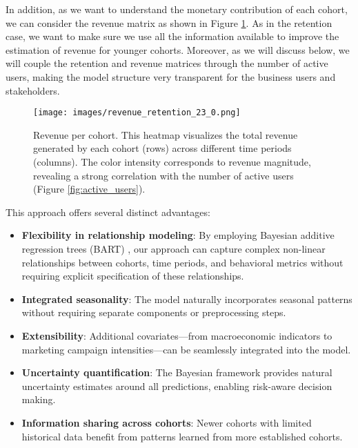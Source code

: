 \documentclass[11pt]{amsart}
\theoremstyle{definition}
\begin{document}
In addition, as we want to understand the monetary contribution of each cohort, we can consider the revenue matrix as shown
in Figure \ref{fig:revenue_matrix}. As in the retention case, we want to make sure we use all the information available to
improve the estimation of revenue for younger cohorts. Moreover, as we will discuss below, we will couple the retention and
revenue matrices through the number of active users, making the model structure very transparent for the business users
and stakeholders.

\begin{figure}
    \centering
    \texttt{[image: images/revenue\_retention\_23\_0.png]}
    \caption{Revenue per cohort. This heatmap visualizes the total revenue generated by each cohort (rows) across different
        time periods (columns). The color intensity corresponds to revenue magnitude, revealing a strong correlation
        with the number of active users (Figure \ref{fig:active_users}).}
    \label{fig:revenue_matrix}
\end{figure}

This approach offers several distinct advantages:

\begin{itemize}
    \item \textbf{Flexibility in relationship modeling}: By employing Bayesian additive regression trees (BART)
          \cite{quiroga2022bart}, our approach can capture complex non-linear relationships between cohorts, time periods,
          and behavioral metrics without requiring explicit specification of these relationships.

    \item \textbf{Integrated seasonality}: The model naturally incorporates seasonal patterns without requiring separate
          components or preprocessing steps.

    \item \textbf{Extensibility}: Additional covariates—from macroeconomic indicators to marketing campaign intensities—can
          be seamlessly integrated into the model.

    \item \textbf{Uncertainty quantification}: The Bayesian framework provides natural uncertainty estimates around all
          predictions, enabling risk-aware decision making.

    \item \textbf{Information sharing across cohorts}: Newer cohorts with limited historical data benefit from patterns
          learned from more established cohorts.
\end{itemize}
\end{document}
